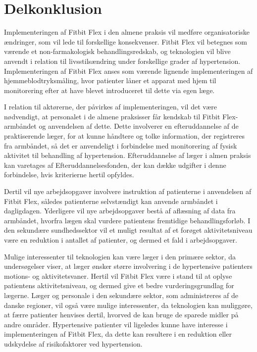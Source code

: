 \section{Delkonklusion}
Implementeringen af Fitbit Flex i den almene praksis vil medføre organisatoriske ændringer, som vil lede til forskellige konsekvenser. Fitbit Flex vil betegnes som værende et non-farmakologisk behandlingsredskab, og teknologien vil blive anvendt i relation til livsstilsændring under forskellige grader af hypertension. Implementeringen af Fitbit Flex anses som værende lignende implementeringen af hjemmeblodtryksmåling, hvor patienter låner et apparat med hjem til monitorering efter at have blevet introduceret til dette via egen læge.

I relation til aktørerne, der påvirkes af implementeringen, vil det være nødvendigt, at personalet i de almene praksisser får kendskab til Fitbit Flex-armbåndet og anvendelsen af dette. Dette involverer en efteruddannelse af de praktiserende læger, for at kunne håndtere og tolke information, der registreres fra armbåndet, så det er anvendeligt i forbindelse med monitorering af fysisk aktivitet til behandling af hypertension. Efteruddannelse af læger i almen praksis kan varetages af Efteruddannelsesfonden, der kan dække udgifter i denne forbindelse, hvis kriterierne hertil opfyldes.

Dertil vil nye arbejdsopgaver involvere instruktion af patienterne i anvendelsen af Fitbit Flex, således patienterne selvstændigt kan anvende armbåndet i dagligdagen. Yderligere vil nye arbejdsopgaver bestå af aflæsning af data fra armbåndet, hvorfra lægen skal vurdere patientens fremtidige behandlingsforløb. I den sekundære sundhedssektor vil et muligt resultat af et forøget aktivitetsniveau være en reduktion i antallet af patienter, og dermed et fald i arbejdsopgaver. 

Mulige interessenter til teknologien kan være læger i den primære sektor, da undersøgelser viser, at læger ønsker større involvering i de hypertensive patienters motions- og aktivitetsvaner. Hertil vil Fitbit Flex være i stand til at oplyse patientens aktivitetsniveau, og dermed give et bedre vurderingsgrundlag for lægerne. Læger og personale i den sekundære sektor, som administreres af de danske regioner, vil også være mulige interessenter, da teknologien kan muliggøre, at færre patienter henvises dertil, hvorved de kan bruge de sparede midler på andre områder. 
Hypertensive patienter vil ligeledes kunne have interesse i implementeringen af Fitbit Flex, da dette kan resultere i en reduktion eller udskydelse af risikofaktorer ved hypertension.  





